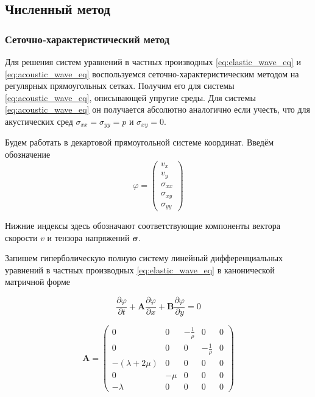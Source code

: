 \subsection{Численный метод}

\subsubsection{Сеточно-характеристический метод}
\label{sec:elastic_gcm}

Для решения систем уравнений в частных производных \eqref{eq:elastic_wave_eq} и \eqref{eq:acoustic_wave_eq} воспользуемся сеточно-характеристическим методом на регулярных прямоугольных сетках. Получим его для системы \eqref{eq:acoustic_wave_eq}, описывающей упругие среды. Для системы \eqref{eq:acoustic_wave_eq} он получается абсолютно аналогично если учесть, что для акустических сред $\sigma_{xx} = \sigma_{yy} = p$ и $\sigma_{xy}=0$.

Будем работать в декартовой прямоугольной системе координат. Введём обозначение 
\begin{equation}
    \varphi = \begin{pmatrix} v_x \\ v_y \\ \sigma_{xx} \\ \sigma_{xy} \\ \sigma_{yy} \end{pmatrix}
\end{equation}

Нижние индексы здесь обозначают соответствующие компоненты вектора скорости $v$ и тензора напряжений $\pmb{\sigma}$.

Запишем гиперболическую полную систему линейный дифференциальных уравнений в частных производных \eqref{eq:elastic_wave_eq} в канонической матричной форме

\begin{equation}
    \dfrac{\partial \varphi}{\partial t} + 
    \pmb{A} \dfrac{\partial \varphi}{\partial x} + 
    \pmb{B} \dfrac{\partial \varphi}{\partial y} = 0
\end{equation}

\begin{equation}
    \pmb{A} = \begin{pmatrix}
        0 & 0 & -\frac{1}{\rho} & 0 & 0 \\
        0 & 0 & 0 & -\frac{1}{\rho} & 0 \\
        -(\lambda+2\mu) & 0 & 0 & 0 & 0 \\
        0 & -\mu & 0 & 0 & 0 \\
        -\lambda & 0 & 0 & 0 & 0
    \end{pmatrix}
\end{equation}

